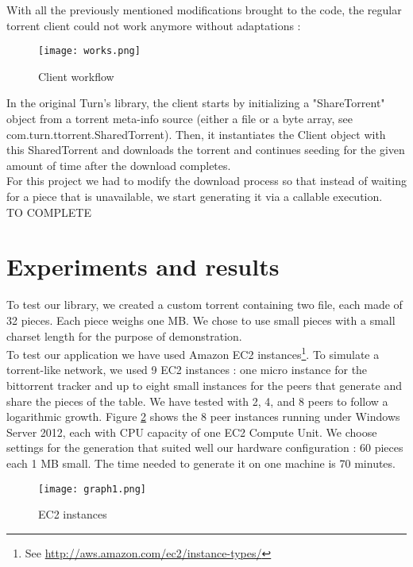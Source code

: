 \documentclass[a4paper]{article}
\begin{document}
{With all the previously mentioned modifications brought to the code, the regular torrent client could not work anymore without adaptations :

\vspace{2mm}
\begin{figure}[H]
  \centering
    \texttt{[image: works.png]}
    \caption{Client workflow}
    \label{works}
\end{figure}
\vspace{2mm}

In the original Turn's library, the client starts by initializing a "ShareTorrent" object from a torrent meta-info source (either a file or a byte array, see com.turn.ttorrent.SharedTorrent). Then, it instantiates the Client object with this SharedTorrent and downloads the torrent and continues seeding for the given amount of time after the download completes.\\

For this project we had to modify the download process so that instead of waiting for a piece that is unavailable, we start generating it via a callable execution. \\

TO COMPLETE

\section{Experiments and results}

To test our library, we created a custom torrent containing two file, each made of 32 pieces. Each piece weighs one MB. We chose to use small pieces with a small charset length for the purpose of demonstration.\\

To test our application we have used Amazon EC2 instances\footnote{See \url{http://aws.amazon.com/ec2/instance-types/}}. To simulate a torrent-like network, we used 9 EC2 instances : one micro instance for the bittorrent tracker and up to eight small instances for the peers that generate and share the pieces of the table. We have tested with 2, 4, and 8 peers to follow a logarithmic growth. Figure \ref{graph1} shows the 8 peer instances running under Windows Server 2012, each with CPU capacity of one EC2 Compute Unit. We choose settings for the generation that suited well our hardware configuration : 60 pieces each 1 MB small. The time needed to generate it on one machine is 70 minutes.

\vspace{3mm}
\begin{figure}[H]
  \centering
    \texttt{[image: graph1.png]}
    \caption{EC2 instances}
    \label{graph1}
\end{figure}
\vspace{2mm}

}
\end{document}
